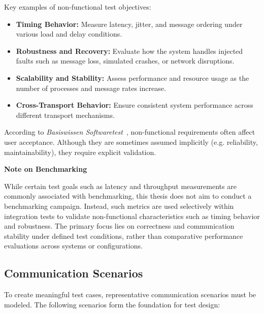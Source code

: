\vspace{1em}
Key examples of non-functional test objectives:

\begin{itemize}
	\item \textbf{Timing Behavior:} Measure latency, jitter, and message ordering under various load and delay conditions.
	\item \textbf{Robustness and Recovery:} Evaluate how the system handles injected faults such as message loss, simulated crashes, or network disruptions.
	\item \textbf{Scalability and Stability:} Assess performance and resource usage as the number of processes and message rates increase.
	\item \textbf{Cross-Transport Behavior:} Ensure consistent system performance across different transport mechanisms.
\end{itemize}

According to \textit{Basiswissen Softwaretest}~\cite{spillner2019softwaretest}, non-functional requirements often affect user acceptance. Although they are sometimes assumed implicitly (e.g. reliability, maintainability), they require explicit validation.

\vspace{1em}
\textbf{Note on Benchmarking}

\vspace{0.4em}
While certain test goals such as latency and throughput measurements are commonly associated with benchmarking, this thesis does not aim to conduct a benchmarking campaign. Instead, such metrics are used selectively within integration tests to validate non-functional characteristics such as timing behavior and robustness. The primary focus lies on correctness and communication stability under defined test conditions, rather than comparative performance evaluations across systems or configurations.


\subsection{Communication Scenarios}

To create meaningful test cases, representative communication scenarios must be modeled. The following scenarios form the foundation for test design:

